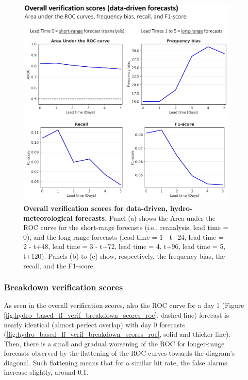 \begin{figure}[htbp]
\centering
\includegraphics[width=\textwidth]{hydro_based_ff_verif_overall_scores.png}
\caption{\textbf{Overall verification scores for data-driven, hydro-meteorological forecasts.} Panel (a) shows the Area under the ROC curve for the short-range forecasts (i.e., reanalysis, lead time = 0), and the long-range forecasts (lead time = 1 - t+24, lead time = 2 - t+48, lead time = 3 - t+72, lead time = 4, t+96, lead time = 5, t+120). Panels (b) to (c) show, respectively, the frequency bias, the recall, and the F1-score.}
\label{fig:hydro_based_ff_verif_overall_scores}
\end{figure}

\subsubsection{Breakdown verification scores}

As seen in the overall verification scores, also the ROC curve for a day 1 (Figure \ref{fig:hydro_based_ff_verif_breakdown_scores_roc}, dashed line) forecast is nearly identical (almost perfect overlap) with day 0 forecasts (\ref{fig:hydro_based_ff_verif_breakdown_scores_roc}, solid and thicker line). Then, there is a small and gradual worsening of the ROC for longer-range forecasts observed by the flattening of the ROC curves towards the diagram's diagonal. Such flattening means that for a similar hit rate, the false alarms increase slightly, around 0.1.

